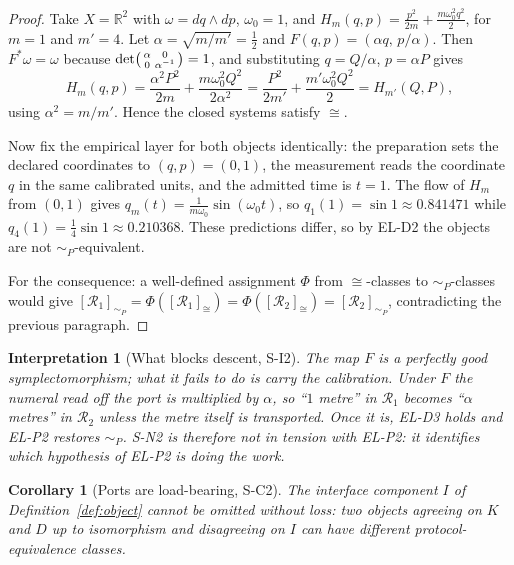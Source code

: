 \documentclass[11pt]{article}
\theoremstyle{plain}
\newtheorem{corollary}[definition]{Corollary}
\newtheorem{interpretation}[definition]{Interpretation}
\newcommand{\R}{\mathbb{R}}
\begin{document}
\begin{proof}
Take $X=\R^2$ with $\omega=dq\wedge dp$, $\omega_0=1$, and
$H_m(q,p)=\tfrac{p^2}{2m}+\tfrac{m\omega_0^2q^2}{2}$, for $m=1$ and $m'=4$. Let
$\alpha=\sqrt{m/m'}=\tfrac12$ and $F(q,p)=(\alpha q,\,p/\alpha)$. Then
$F^*\omega=\omega$ because $\det\begin{psmallmatrix}\alpha&0\\0&\alpha^{-1}
\end{psmallmatrix}=1$, and substituting $q=Q/\alpha$, $p=\alpha P$ gives
\[
 H_m(q,p)=\frac{\alpha^2P^2}{2m}+\frac{m\omega_0^2Q^2}{2\alpha^2}
 =\frac{P^2}{2m'}+\frac{m'\omega_0^2Q^2}{2}=H_{m'}(Q,P),
\]
using $\alpha^2=m/m'$. Hence the closed systems satisfy $\cong$.

Now fix the empirical layer for both objects identically: the preparation sets
the declared coordinates to $(q,p)=(0,1)$, the measurement reads the coordinate
$q$ in the same calibrated units, and the admitted time is $t=1$. The flow of
$H_m$ from $(0,1)$ gives $q_m(t)=\frac{1}{m\omega_0}\sin(\omega_0 t)$, so
$q_1(1)=\sin 1\approx0.841471$ while $q_4(1)=\tfrac14\sin 1\approx0.210368$.
These predictions differ, so by EL-D2 the objects are not $\sim_P$-equivalent.

For the consequence: a well-defined assignment $\Phi$ from $\cong$-classes to
$\sim_P$-classes would give
$[\mathcal{R}_1]_{\sim_P}=\Phi([\mathcal{R}_1]_{\cong})
=\Phi([\mathcal{R}_2]_{\cong})=[\mathcal{R}_2]_{\sim_P}$, contradicting the
previous paragraph.
\end{proof}

\begin{interpretation}[What blocks descent, S-I2]
\label{int:blocks}
The map $F$ is a perfectly good symplectomorphism; what it fails to do is carry
the calibration. Under $F$ the numeral read off the port is multiplied by
$\alpha$, so ``$1$ metre'' in $\mathcal{R}_1$ becomes ``$\alpha$ metres'' in
$\mathcal{R}_2$ unless the metre itself is transported. Once it is, EL-D3 holds
and EL-P2 restores $\sim_P$. S-N2 is therefore not in tension with EL-P2: it
identifies which hypothesis of EL-P2 is doing the work.
\end{interpretation}

\begin{corollary}[Ports are load-bearing, S-C2]
\label{cor:ports}
The interface component $I$ of Definition~\ref{def:object} cannot be omitted
without loss: two objects agreeing on $K$ and $D$ up to isomorphism and
disagreeing on $I$ can have different protocol-equivalence classes.
\end{corollary}
\end{document}
